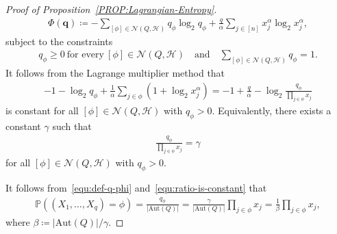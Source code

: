 \documentclass[11pt,a4paper]{article}
\begin{document}
\begin{proof}[Proof of Proposition~\ref{PROP:Lagrangian-Entropy}]
    \begin{align*}
        \Phi(\mathbf{q})
        \coloneqq 
        - \sum_{[\phi] \in \mathcal{N}(Q,\mathcal{H})} q_{\phi} \log_{2} q_{\phi} + \frac{q}{\alpha} \sum_{j \in [n]} x_{j}^{\alpha} \log_{2} x_{j}^{\alpha}, 
    \end{align*}
    subject to the constraints 
    \begin{align*}
        q_{\phi} \ge 0 ~\text{for every}~ [\phi] \in \mathcal{N}(Q,\mathcal{H})
        \quad\text{and}\quad 
        \sum_{[\phi] \in \mathcal{N}(Q,\mathcal{H})} q_{\phi} = 1. 
    \end{align*}
    It follows from the Lagrange multiplier method that 
    \begin{align*}
        -1 - \log_{2} q_{\phi} + \frac{1}{\alpha} \sum_{j \in \phi} \left(1+\log_{2} x_j^{\alpha}\right) 
        = -1+\frac{q}{\alpha} - \log_{2} \frac{q_{\phi}}{\prod_{j\in \phi} x_j}
    \end{align*}
    is constant for all $[\phi] \in \mathcal{N}(Q,\mathcal{H})$ with $q_{\phi} > 0$. 
    Equivalently, there exists a constant $\gamma$ such that 
    \begin{align}\label{equ:ratio-is-constant}
        \frac{q_{\phi}}{\prod_{j \in \phi} x_j} = \gamma
    \end{align}
    for all $[\phi] \in \mathcal{N}(Q,\mathcal{H})$ with $q_{\phi} > 0$.

    It follows from~\eqref{equ:def-q-phi} and~\eqref{equ:ratio-is-constant} that 
    \begin{align}\label{equ:p-phi}
        \mathbb{P}\left((X_1, \ldots, X_q) = \phi \right)
        = \frac{q_{\phi}}{|\mathrm{Aut}(Q)|}
        = \frac{\gamma}{|\mathrm{Aut}(Q)|}  \prod_{j \in \phi} x_j
        = \frac{1}{\beta} \prod_{j \in \phi} x_j,  
    \end{align}
    where $\beta \coloneqq |\mathrm{Aut}(Q)|/\gamma$. 
    

\end{proof}
\end{document}
